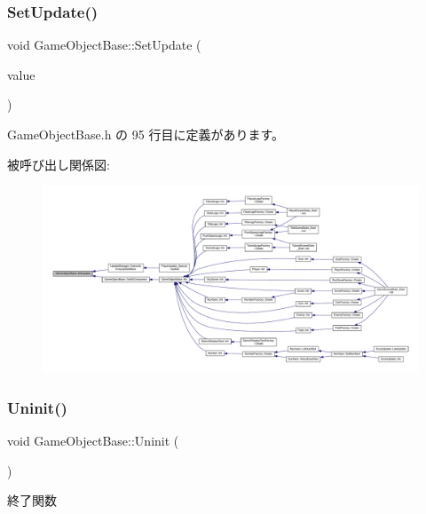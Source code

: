 \subsubsection{\texorpdfstring{Set\+Update()}{SetUpdate()}}
{\footnotesize\ttfamily void Game\+Object\+Base\+::\+Set\+Update (\begin{DoxyParamCaption}\item[{\mbox{\hyperlink{class_update_base}{Update\+Base}} $\ast$}]{value }\end{DoxyParamCaption})\hspace{0.3cm}{\ttfamily [inline]}}



 Game\+Object\+Base.\+h の 95 行目に定義があります。

被呼び出し関係図\+:\nopagebreak
\begin{figure}[H]
\begin{center}
\leavevmode
\includegraphics[width=350pt]{class_game_object_base_a71704e8310b3183f3f88869f8fd27d08_icgraph}
\end{center}
\end{figure}
\mbox{\label{class_game_object_base_a97e1bc277d7b1c0156d4735de29a022c}} 
\subsubsection{\texorpdfstring{Uninit()}{Uninit()}}
{\footnotesize\ttfamily void Game\+Object\+Base\+::\+Uninit (\begin{DoxyParamCaption}{ }\end{DoxyParamCaption})\hspace{0.3cm}{\ttfamily [virtual]}}



終了関数 



